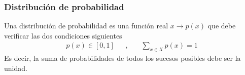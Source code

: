 \documentclass[letterpaper,10pt,english]{jupyterBook}
\begin{document}
\subsubsection{Distribución de probabilidad}
\label{\detokenize{docs/Part_01_Formalismo/Chapter_01_02_Formalismo_matem_xe1tico/01_05_Probabilidades_myst:distribucion-de-probabilidad}}
\sphinxAtStartPar
Una distribución de probabilidad es una función real \(x\to p(x)\) que debe  verificar las dos condiciones siguientes
\begin{equation*}
\begin{split}
p(x) \in [0,1]~~~~~~~,~~~~~~~~\sum_{x\in X }p(x) = 1 
\end{split}
\end{equation*}
\sphinxAtStartPar
Es decir, la suma de probabilidades de todos los sucesos posibles debe ser la unidad.
\end{document}
